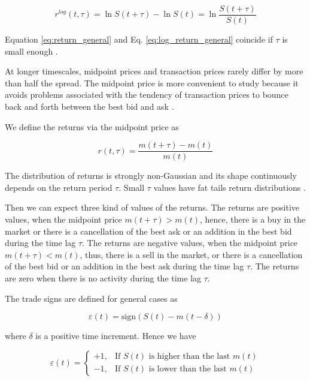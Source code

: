 \begin{equation}\label{eq:log_return_general}
    r^{log}\left(t,\tau\right) = \ln S\left(t + \tau\right)
    - \ln S\left(t\right) = \ln \frac{S\left(t + \tau\right)}{S\left(t\right)}
\end{equation}

Equation \ref{eq:return_general} and Eq. \ref{eq:log_return_general} coincide
if $\tau$ is small enough \cite{subtle_nature,empirical_facts}.

At longer timescales, midpoint prices and transaction prices rarely differ by
more than half the spread. The midpoint price is more convenient to study
because it avoids problems associated with the tendency of transaction prices
to bounce back and forth between the best bid and ask
\cite{large_prices_changes}.

We define the returns via the midpoint price as

\begin{equation}\label{eq:midpoint_price_return}
    r\left(t,\tau\right) = \frac{m\left(t+\tau\right)-m\left(t\right)}
    {m\left(t\right)}
\end{equation}

The distribution of returns is strongly non-Gaussian and its shape continuously
depends on the return period $\tau$. Small $\tau$ values have fat tails return
distributions \cite{subtle_nature}.

Then we can expect three kind of values of the returns. The returns are
positive values, when the midpoint price
$m\left(t+\tau\right) > m\left(t\right)$, hence, there is a buy in the market
or there is a cancellation of the best ask or an addition in the best bid
during the time lag $\tau$. The returns are negative values, when the midpoint
price $m\left(t+\tau\right) < m\left(t\right)$, thus, there is a sell in the
market, or there is a cancellation of the best bid or an addition in the best
ask during the time lag $\tau$. The returns are zero when there is no activity
during the time lag $\tau$.

The trade signs are defined for general cases as

\begin{equation}\label{eq:trade_sign_general}
    \varepsilon\left(t\right)=\text{sign}\left(S\left(t\right)
    -m\left(t-\delta\right)\right)
\end{equation}

where $\delta$ is a positive time increment. Hence we have

\begin{equation}\label{eq:trade_sign_results}
    \varepsilon\left(t\right)=\left\{
    \begin{array}{cc}
    +1, & \text{If } S\left(t\right)
    \text{ is higher than the last } m\left( t \right)\\
    -1, & \text{If } S\left(t\right)
    \text{ is lower than the last } m\left( t \right)
    \end{array}\right.
\end{equation}

